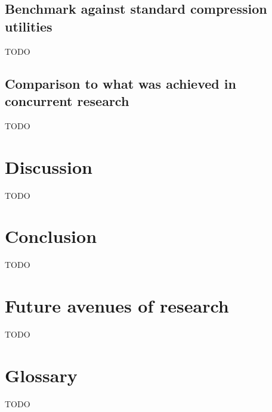 \subsection{Benchmark against standard compression utilities}
{\color{red}TODO}
\subsection{Comparison to what was achieved in concurrent research}
{\color{red}TODO}
\section{Discussion}
{\color{red}TODO}
\section{Conclusion}
{\color{red}TODO}
\section{Future avenues of research}
{\color{red}TODO}
\section{Glossary}
{\color{red}TODO}


